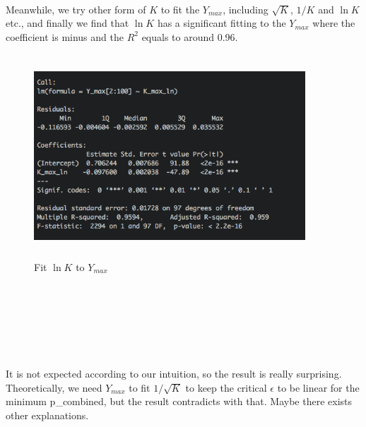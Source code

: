\documentclass[10pt,english]{article}\usepackage{graphicx, color}
\numberwithin{equation}{section}
\numberwithin{figure}{section}
\begin{document}
\quad\\
Meanwhile, we try other form of $K$ to fit the $Y_{max}$, including $\sqrt{K}$, $1/K$ and $\ln{K}$ etc., and finally we find that $\ln{K}$ has a significant fitting to the $Y_{max}$ where the coefficient is minus and the $R^2$ equals to around 0.96.\\
\begin{figure}[htbp]
\centering\includegraphics[width=4in, height=3in]{ln}
\caption{Fit $\ln{K}$ to $Y_{max}$}
\end{figure}
\quad\\
\quad\\
\quad\\
\quad\\
\quad\\
\quad\\
It is not expected according to our intuition, so the result is really surprising. Theoretically, we need $Y_{max}$ to fit $1/\sqrt{K}$ to keep the critical $\epsilon$ to be linear for the minimum p\_combined, but the result contradicts with that. Maybe there exists other explanations.
\end{document}
